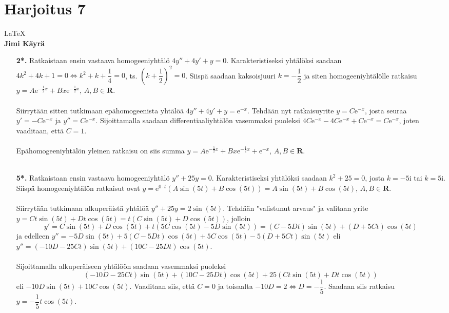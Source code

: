 \documentclass[12pt,fleqn]{article}
\begin{document}
\section*{Harjoitus 7}
\LaTeX\\
\textbf{Jimi Käyrä}\\
\begin{enumerate}[label=\textbf{\arabic*.}]
\item [\textbf{2*.}] Ratkaistaan ensin vastaava homogeeniyhtälö \(4y''+4y'+y=0\). Karakteristiseksi yhtälöksi saadaan \(4k^2+4k+1=0\iff k^2+k+\dfrac{1}{4}=0\), ts. \(\left (k+\dfrac{1}{2}\right )^2=0\). Siispä saadaan kaksoisjuuri \(k=-\dfrac{1}{2}\) ja siten homogeeniyhtälölle ratkaisu \(y=A\text{e}^{-\frac{1}{2}x}+Bx\text{e}^{-\frac{1}{2}x}\), \(A, B\in \mathbf{R}\).\\
 \\
Siirrytään sitten tutkimaan epähomogeenista yhtälöä \(4y''+4y'+y=\text{e}^{-x}\). Tehdään nyt ratkaisuyrite \(y=C\text{e}^{-x}\), josta seuraa \(y'=-C\text{e}^{-x}\) ja \(y''=C\text{e}^{-x}\). Sijoittamalla saadaan differentiaaliyhtälön vasemmaksi puoleksi \(4C\text{e}^{-x}-4C\text{e}^{-x}+C\text{e}^{-x}=C\text{e}^{-x}\), joten vaaditaan, että \(C=1\).\\
 \\
Epähomogeeniyhtälön yleinen ratkaisu on siis summa \(y=A\text{e}^{-\frac{1}{2}x}+Bx\text{e}^{-\frac{1}{2}x}+\text{e}^{-x}\), \(A, B\in \mathbf{R}\).\\
 \\
\item [\textbf{5*.}] Ratkaistaan ensin vastaava homogeeniyhtälö \(y''+25y=0\). Karakteristiseksi yhtälöksi saadaan \(k^2+25=0\), josta \(k=-5\text{i}\) tai \(k=5\text{i}\). Siispä homogeeniyhtälön ratkaisut ovat \(y=\text{e}^{0\cdot t} (A \sin (5t)+B\cos (5t))=A\sin (5t)+B\cos (5t)\), \(A, B\in \mathbf{R}\).\\
 \\
Siirrytään tutkimaan alkuperäistä yhtälöä \(y''+25y=2\sin (5t)\). Tehdään "valistunut arvaus" ja valitaan yrite \(y=Ct\sin (5t)+Dt\cos (5t)=t(C\sin (5t)+D\cos (5t))\), jolloin \[y'=C\sin (5t)+D\cos (5t) + t(5C\cos (5t)-5D\sin (5t))=(C-5Dt)\sin (5t)+(D+5Ct)\cos (5t)\] ja edelleen \(y''=-5D\sin (5t)+5(C-5Dt)\cos (5t)+5C\cos (5t)-5(D+5Ct)\sin (5t)\) eli \(y''=(-10D-25Ct)\sin (5t)+(10C-25Dt)\cos (5t).\)\\
 \\
Sijoittamalla alkuperäiseen yhtälöön saadaan vasemmaksi puoleksi \[(-10D-25Ct)\sin (5t)+(10C-25Dt)\cos (5t)+25(Ct\sin (5t)+Dt\cos (5t))\] eli \(-10D\sin (5t)+10C\cos (5t)\). Vaaditaan siis, että \(C=0\) ja toisaalta \(-10D=2\iff D=-\dfrac{1}{5}\). Saadaan siis ratkaisu \(y=-\dfrac{1}{5}t\cos (5t)\).\\

\end{enumerate}
\end{document}
